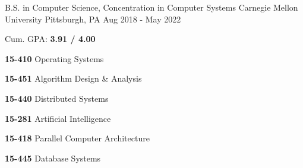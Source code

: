 
\begin{cventries}

  \cventry
    {B.S. in Computer Science, Concentration in Computer Systems} %
    {Carnegie Mellon University} %
    {Pittsburgh, PA} %
    {Aug 2018 - May 2022} %
    {
      \begin{cvitems} %
	  \item {Cum. GPA: \textbf{3.91 / 4.00}}
	  \item {}
	  \item {}
		\vspace{0.5mm}
		\setlength\multicolsep{0pt}
		\begin{multicols}{3}
		  \item[] {\textbf{15-410} Operating Systems}
		  \item[] {\textbf{15-451} Algorithm Design \& Analysis}
		  \item[] {\textbf{15-440} Distributed Systems}
		  \item[] {\textbf{15-281} Artificial Intelligence}
		  \item[] {\textbf{15-418} Parallel Computer Architecture}
		  \item[] {\textbf{15-445} Database Systems}
		\end{multicols}
      \end{cvitems}
    }

\end{cventries}
